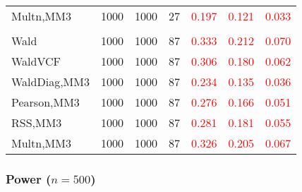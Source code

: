 \documentclass[
]{article}
\begin{document}
\begin{table}[H]
{\begin{tabular}[t]{lrrrrrr}
\hspace{1em}Multn,MM3 & 1000 & 1000 & 27 & \textcolor{red}{0.197} & \textcolor{red}{0.121} & \textcolor{red}{0.033}\\
\addlinespace[0.3em]
\multicolumn{7}{l}{\textbf{3F 15V}}\\
\hspace{1em}Wald & 1000 & 1000 & 87 & \textcolor{red}{0.333} & \textcolor{red}{0.212} & \textcolor{red}{0.070}\\
\hspace{1em}WaldVCF & 1000 & 1000 & 87 & \textcolor{red}{0.306} & \textcolor{red}{0.180} & \textcolor{red}{0.062}\\
\hspace{1em}WaldDiag,MM3 & 1000 & 1000 & 87 & \textcolor{red}{0.234} & \textcolor{red}{0.135} & \textcolor{red}{0.036}\\
\hspace{1em}Pearson,MM3 & 1000 & 1000 & 87 & \textcolor{red}{0.276} & \textcolor{red}{0.166} & \textcolor{red}{0.051}\\
\hspace{1em}RSS,MM3 & 1000 & 1000 & 87 & \textcolor{red}{0.281} & \textcolor{red}{0.181} & \textcolor{red}{0.055}\\
\hspace{1em}Multn,MM3 & 1000 & 1000 & 87 & \textcolor{red}{0.326} & \textcolor{red}{0.205} & \textcolor{red}{0.067}\\
\bottomrule
\end{tabular}}
\endgroup{}
\end{table}

\hypertarget{power-n500-1}{%
\subsubsection{\texorpdfstring{Power
(\(n=500\))}{Power (n=500)}}\label{power-n500-1}}
\end{document}
